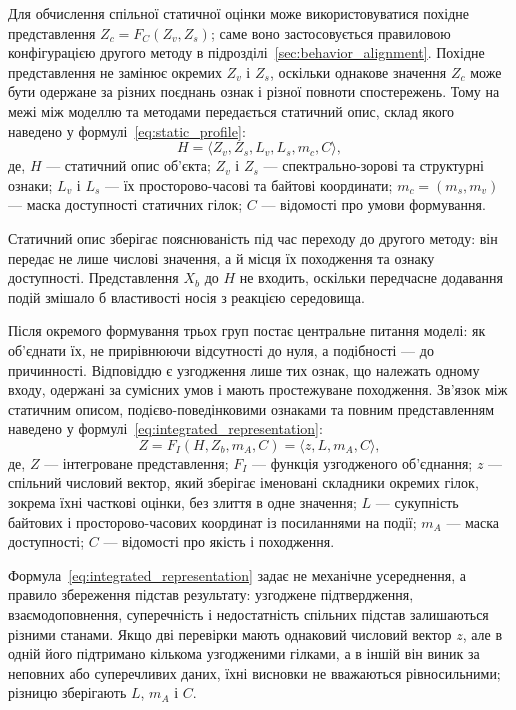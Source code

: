 Для обчислення спільної статичної оцінки може використовуватися похідне представлення $Z_c=F_C(Z_v,Z_s)$; саме воно застосовується правиловою конфігурацією другого методу в підрозділі~\ref{sec:behavior_alignment}. Похідне представлення не замінює окремих $Z_v$ і $Z_s$, оскільки однакове значення $Z_c$ може бути одержане за різних поєднань ознак і різної повноти спостережень. Тому на межі між моделлю та методами передається статичний опис, склад якого наведено у формулі~\eqref{eq:static_profile}:
\begin{equation}
H=\langle Z_v,Z_s,L_v,L_s,m_c,C\rangle,
\label{eq:static_profile}
\end{equation}
де, $H$ --- статичний опис об’єкта; $Z_v$ і $Z_s$ --- спектрально-зорові та структурні ознаки; $L_v$ і $L_s$ --- їх просторово-часові та байтові координати; $m_c=(m_s,m_v)$ --- маска доступності статичних гілок; $C$ --- відомості про умови формування.

Статичний опис зберігає пояснюваність під час переходу до другого методу: він передає не лише числові значення, а й місця їх походження та ознаку доступності. Представлення $X_b$ до $H$ не входить, оскільки передчасне додавання подій змішало б властивості носія з реакцією середовища.

Після окремого формування трьох груп постає центральне питання моделі: як об’єднати їх, не прирівнюючи відсутності до нуля, а подібності --- до причинності. Відповіддю є узгодження лише тих ознак, що належать одному входу, одержані за сумісних умов і мають простежуване походження. Зв’язок між статичним описом, подієво-поведінковими ознаками та повним представленням наведено у формулі~\eqref{eq:integrated_representation}:
\begin{equation}
Z=F_I(H,Z_b,m_A,C)=\langle z,L,m_A,C\rangle,
\label{eq:integrated_representation}
\end{equation}
де, $Z$ --- інтегроване представлення; $F_I$ --- функція узгодженого об’єднання; $z$ --- спільний числовий вектор, який зберігає іменовані складники окремих гілок, зокрема їхні часткові оцінки, без злиття в одне значення; $L$ --- сукупність байтових і просторово-часових координат із посиланнями на події; $m_A$ --- маска доступності; $C$ --- відомості про якість і походження.

Формула~\eqref{eq:integrated_representation} задає не механічне усереднення, а правило збереження підстав результату: узгоджене підтвердження, взаємодоповнення, суперечність і недостатність спільних підстав залишаються різними станами. Якщо дві перевірки мають однаковий числовий вектор $z$, але в одній його підтримано кількома узгодженими гілками, а в іншій він виник за неповних або суперечливих даних, їхні висновки не вважаються рівносильними; різницю зберігають $L$, $m_A$ і $C$.

